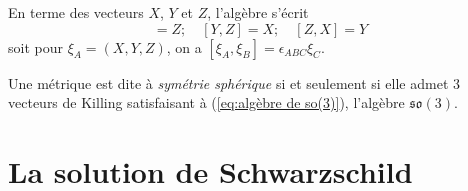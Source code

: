 \begin{rmk}
    En terme des vecteurs $X$, $Y$ et $Z$, l'algèbre s'écrit
    \begin{equation}
        [X,Y]  = Z ; \quad [Y,Z]  = X ; \quad [Z,X]  = Y
    \end{equation}
    soit pour $\xi_A = (X,Y,Z)$, on a $[\xi_A,\xi_B] = \epsilon_{ABC} \xi_C$.
\end{rmk}
\begin{theoremframe}
    \begin{defi}
        Une métrique est dite à \emph{symétrie sphérique} si et seulement si elle admet 3 vecteurs de Killing satisfaisant à (\ref{eq:algèbre de so(3)}), l'algèbre $\mathfrak{so}(3)$.
    \end{defi}
\end{theoremframe}
\section{La solution de Schwarzschild}
